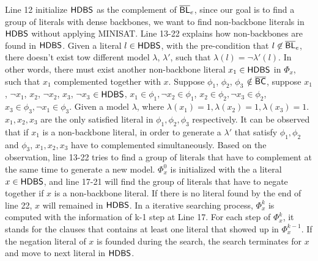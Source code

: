 Line 12 initialize $\textsf{HDBS}$ as the complement of $\overline{\textsf{BL}}_e$, since our goal is to find a group of literals with dense backbones, we want to find non-backbone literals in $\textsf{HDBS}$ without applying MINISAT. Line 13-22 explains how non-backbones are found in $\textsf{HDBS}$. Given a literal $l\in\textsf{HDBS}$, with the pre-condition that $l\not\in\overline{\textsf{BL}}_e$, there doesn't exist tow different model $\lambda$, $\lambda'$, such that $\lambda(l)=\neg\lambda'(l)$. In other words, there must exist another non-backbone literal $x_1\in\textsf{HDBS}$ in $\Phi_x$, such that $x_1$ complemented together with $x$.
Suppose $\phi_1$, $\phi_2$, $\phi_3$ $\notin\overline{\textsf{BC}}$, suppose $x_1$, $\neg x_1$, $x_2$, $\neg x_2$, $x_3$, $\neg x_3$ $\in\textsf{HDBS}$, $x_1\in\phi_1, \neg x_2\in\phi_1$, $x_2\in\phi_2, \neg x_3\in\phi_2$, $x_3\in\phi_3, \neg x_1\in\phi_3$.
Given a model $\lambda$, where $\lambda(x_1)=1, \lambda(x_2)=1, \lambda(x_3)=1$. $x_1, x_2, x_3$ are the only satisfied literal in $\phi_1, \phi_2, \phi_3$ respectively.
It can be observed that if $x_1$ is a non-backbone literal, in order to generate a $\lambda'$ that satisfy $\phi_1, \phi_2$ and $\phi_3$, $x_1, x_2, x_3$ have to complemented simultaneously. Based on the observation, line 13-22 tries to find a group of literals that have to complement at the same time to generate a new model.
$\Phi_x^0$ is initialized with the a literal $x\in\textsf{HDBS}$, and line 17-21 will find the group of literals that have to negate together if $x$ is a non-backbone literal. If there is no literal found by the end of line 22, $x$ will remained in $\textsf{HDBS}$. In a iterative searching process, $\Phi_x^k$ is computed with the information of k-1 step at Line 17. For each step of $\Phi_x^k$, it stands for the clauses that contains at least one literal that showed up in $\Phi^{k-1}_x$. If the negation literal of $x$ is founded during the search, the search terminates for $x$ and move to next literal in $\textsf{HDBS}$.

